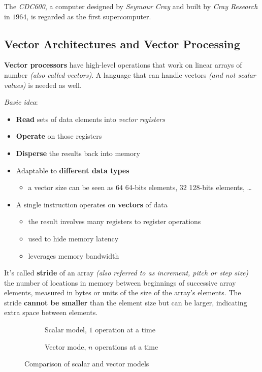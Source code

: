 \documentclass[english]{article}
\begin{document}
The \textit{CDC600}, a computer designed by \textit{Seymour Cray} and built by \textit{Cray Research} in \(1964\), is regarded as the first supercomputer.

\subsection{Vector Architectures and Vector Processing}

\textbf{Vector processors} have high-level operations that work on linear arrays of number \textit{(also called vectors)}.
A language that can handle vectors \textit{(and not scalar values)} is needed as well.

\bigskip
\textit{Basic idea}:
\begin{itemize}
  \item \textbf{Read} sets of data elements into \textit{vector registers}
  \item \textbf{Operate} on those registers
  \item \textbf{Disperse} the results back into memory
  \item Adaptable to \textbf{different data types}
        \begin{itemize}
          \item a vector size can be seen as \(64\) 64-bits elements, \(32\) 128-bits elements, \ldots
        \end{itemize}
  \item A single instruction operates on \textbf{vectors} of data
        \begin{itemize}
          \item the result involves many registers to register operations
          \item used to hide memory latency
          \item leverages memory bandwidth
        \end{itemize}
\end{itemize}

\bigskip
It's called \textbf{stride} of an array \textit{(also referred to as increment, pitch or step size)} the number of locations in memory between beginnings of successive array elements, measured in bytes or units of the size of the array's elements. The stride \textbf{cannot be smaller} than the element size but can be larger, indicating extra space between elements.

\begin{figure}[htbp]
  \bigskip
  \centering
  \begin{subfigure}[b]{0.495\textwidth}
    \centering
    \caption{Scalar model, \(1\) operation at a time}
    \label{subfig:vector-model}
  \end{subfigure}
  \begin{subfigure}[b]{0.495\textwidth}
    \centering
    \caption{Vector mode, \(n\) operations at a time}
    \label{subfig:scalar-model}
  \end{subfigure}
  \caption{Comparison of scalar and vector models}
  \label{fig:comparison-of-models}
  \bigskip
\end{figure}
\end{document}
